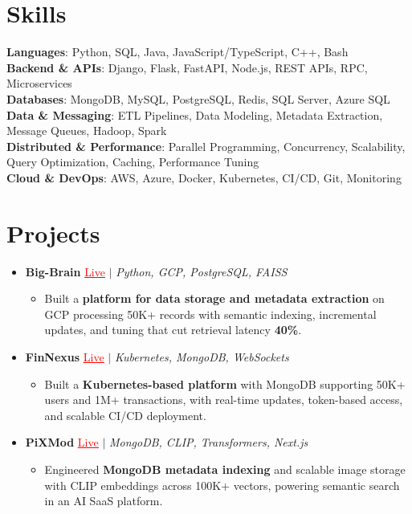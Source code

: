 \documentclass[letterpaper,10pt]{article}
\newcommand{\resumeItem}[1]{\item\small{{#1 \vspace{-2pt}}}}
\newcommand{\resumeProjectHeading}[1]{\item \small #1 \vspace{-2pt}}
\newcommand{\resumeSubHeadingListStart}{\begin{itemize}[leftmargin=0.0in, label={}]}
\newcommand{\resumeSubHeadingListEnd}{\end{itemize}}
\newcommand{\resumeProjItemListStart}{\begin{itemize}[leftmargin=0.15in,label=\textbullet,itemsep=0pt,topsep=0pt,parsep=0pt,partopsep=0pt]}
\newcommand{\resumeProjItemListEnd}{\end{itemize}\vspace{-4pt}}
\begin{document}
\section{Skills}
\begin{itemize}[leftmargin=0.15in, label={}]
\small{\item{
\textbf{Languages}: Python, SQL, Java, JavaScript/TypeScript, C++, Bash \\
\textbf{Backend \& APIs}: Django, Flask, FastAPI, Node.js, REST APIs, RPC, Microservices \\
\textbf{Databases}: MongoDB, MySQL, PostgreSQL, Redis, SQL Server, Azure SQL \\
\textbf{Data \& Messaging}: ETL Pipelines, Data Modeling, Metadata Extraction, Message Queues, Hadoop, Spark \\
\textbf{Distributed \& Performance}: Parallel Programming, Concurrency, Scalability, Query Optimization, Caching, Performance Tuning \\
\textbf{Cloud \& DevOps}: AWS, Azure, Docker, Kubernetes, CI/CD, Git, Monitoring
}}
\end{itemize}
\vspace{-6pt}
\section{Projects}
\resumeSubHeadingListStart
\vspace{-2pt}
\resumeProjectHeading{\textbf{Big-Brain} {\href{https://big-brain-pied.vercel.app/}{\textcolor{red}{\underline{Live}}}} $|$ \emph{Python, GCP, PostgreSQL, FAISS}}
\resumeProjItemListStart
\resumeItem{Built a \textbf{platform for data storage and metadata extraction} on GCP processing 50K+ records with semantic indexing, incremental updates, and tuning that cut retrieval latency \textbf{40\%}.}
\resumeProjItemListEnd
\vspace{3pt}
\resumeProjectHeading{\textbf{FinNexus} {\href{https://fin-nexus.vercel.app/}{\textcolor{red}{\underline{Live}}}} $|$ \emph{Kubernetes, MongoDB, WebSockets}}
\resumeProjItemListStart
\resumeItem{Built a \textbf{Kubernetes-based platform} with MongoDB supporting 50K+ users and 1M+ transactions, with real-time updates, token-based access, and scalable CI/CD deployment.}
\resumeProjItemListEnd
\vspace{3pt}
\resumeProjectHeading{\textbf{PiXMod} {\href{https://pixmod.vercel.app/}{\textcolor{red}{\underline{Live}}}} $|$ \emph{MongoDB, CLIP, Transformers, Next.js}}
\resumeProjItemListStart
\resumeItem{Engineered \textbf{MongoDB metadata indexing} and scalable image storage with CLIP embeddings across 100K+ vectors, powering semantic search in an AI SaaS platform.}
\resumeProjItemListEnd
\resumeSubHeadingListEnd
\end{document}
